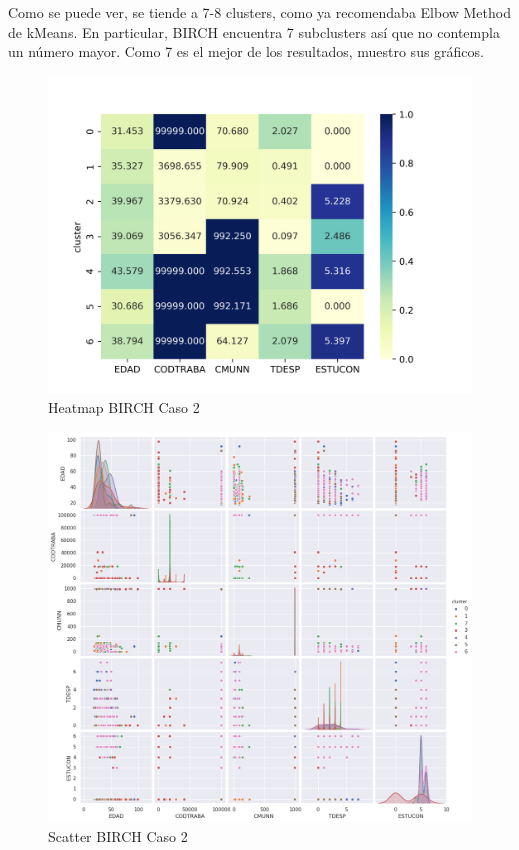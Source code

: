 Como se puede ver, se tiende a 7-8 clusters, como ya recomendaba Elbow Method de kMeans. En particular, BIRCH encuentra 7 subclusters así que no contempla un número mayor. Como 7 es el mejor de los resultados, muestro sus gráficos.

\begin{figure}[H] %
	\centering
	\includegraphics[scale=0.65]{heatmap-br-2.png}  %
	\caption{Heatmap BIRCH Caso 2} 
	\label{fig:hm-br-caso2}
\end{figure}

\begin{figure}[H] %
	\centering
	\includegraphics[scale=0.4]{birch2.png}  %
	\caption{Scatter BIRCH Caso 2} 
	\label{fig:sc-br-caso2}
\end{figure}

